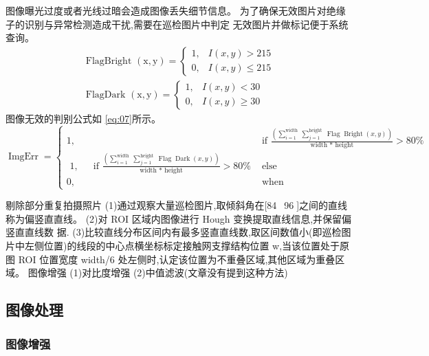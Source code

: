 \message{ !name(main.tex)}\documentclass{amsart}
\begin{document}
图像曝光过度或者光线过暗会造成图像丢失细节信息。
为了确保无效图片对绝缘子的识别与异常检测造成干扰,需要在巡检图片中判定
无效图片并做标记便于系统查询。
  \begin{equation}
    \label{eq:06}
\begin{array}{l}
\text { FlagBright }(\mathrm{x}, \mathrm{y})=\left\{\begin{array}{ll}
1, & I(x, y)>215 \\
0, & I(x, y) \leq 215
\end{array}\right. \\
\text { FlagDark }(\mathrm{x}, \mathrm{y})=\left\{\begin{array}{ll}
1, & I(x, y)<30 \\
0, & I(x, y) \geq 30
\end{array}\right.
\end{array}
\end{equation}
图像无效的判别公式如 \ref{eq:07}所示。
\begin{equation}
  \label{eq:07}
\operatorname{ImgErr}=\left\{\begin{array}{cc}
1, & \text { if } \frac{\left(\sum_{i=1}^{\text {width }} \sum_{j=1}^{\text {height }} \operatorname{Flag} \operatorname{Bright}(x, y)\right)}{\text { width * height }}>80 \% \\
\text { 1, } \quad \text { if } \frac{\left(\sum_{i=1}^{\text {width }} \sum_{j=1}^{\text {height }} \operatorname{Flag} \operatorname{Dark}(x, y)\right)}{\text { width * height }}>80 \% & \text { else } \\
0, & \text { when }
\end{array}\right.
\end{equation}

剔除部分重复拍摄照片
(1)通过观察大量巡检图片,取倾斜角在[84~96]之间的直线称为偏竖直直线。
(2)对 ROI 区域内图像进行 Hough 变换提取直线信息,并保留偏竖直直线数
据.
(3)比较直线分布区间内有最多竖直直线数,取区间数值小(即巡检图片中左侧位置)的线段的中心点横坐标标定接触网支撑结构位置 w,当该位置处于原图 ROI 位置宽度 width/6 处左侧时,认定该位置为不重叠区域,其他区域为重叠区域。
图像增强
(1)对比度增强
(2)中值滤波(文章没有提到这种方法)

\subsection{图像处理}
\label{sec:02}

\subsubsection{图像增强}
\label{sec:0201}
\end{document}
